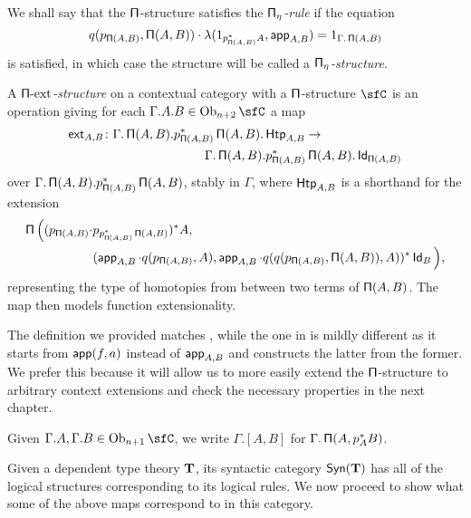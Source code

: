 \begin{defn}
  We shall say that the $\operatorname{\mathsf{\Pi}}$-structure satisfies the
  \emph{$\operatorname{\mathsf{\Pi}_\eta}$-rule} if the equation
  \[q(p_{\operatorname{\mathsf{\Pi}}(A,B)},\operatorname{\mathsf{\Pi}}(A,B))\cdot\lambda(1_{p^*_{\operatorname{\mathsf{\Pi}}(A,B)}A},\operatorname{\mathsf{app}}_{A,B})=1_{\Gamma.\operatorname{\mathsf{\Pi}}(A,B)}\]
  is satisfied, in which case the structure will be called a
  \emph{$\operatorname{\mathsf{\Pi}_\eta}$-structure}. 

  A \emph{$\operatorname{\mathsf{\Pi}-ext}$-structure} on a contextual category with a $\operatorname{\mathsf{\Pi}}$-structure
  $\sfC$ is an operation giving for each $\Gamma.A.B\in\Ob_{n+2}\sfC$ a map
  \begin{align*}
    \operatorname{\mathsf{ext}}_{A,B} &\colon
    \Gamma.\operatorname{\mathsf{\Pi}}(A,B).p^*_{\operatorname{\mathsf{\Pi}}(A,B)}\operatorname{\mathsf{\Pi}}(A,B).\operatorname{\mathsf{Htp}}_{A,B}\rightarrow \\
    &\quad\quad\quad\quad\quad\quad\quad\quad
    \Gamma.\operatorname{\mathsf{\Pi}}(A,B).p^*_{\operatorname{\mathsf{\Pi}}(A,B)}\operatorname{\mathsf{\Pi}}(A,B).\operatorname{\mathsf{Id}}_{\operatorname{\mathsf{\Pi}}(A,B)}
  \end{align*}
  over $\Gamma.\operatorname{\mathsf{\Pi}}(A,B).p^*_{\operatorname{\mathsf{\Pi}}(A,B)}\operatorname{\mathsf{\Pi}}(A,B)$, stably in $\Gamma$, where
  $\operatorname{\mathsf{Htp}}_{A,B}$ is a shorthand for the extension
  \begin{align*}
    \operatorname{\mathsf{\Pi}}\Big((p_{\operatorname{\mathsf{\Pi}}(A,B)}\cdot & p_{p^*_{\operatorname{\mathsf{\Pi}}(A,B)}\operatorname{\mathsf{\Pi}}(A,B)})^*A, \\
    &(\operatorname{\mathsf{app}}_{A,B}\cdot q(p_{\operatorname{\mathsf{\Pi}}(A,B)},A),
    \operatorname{\mathsf{app}}_{A,B}\cdot q(q(p_{\operatorname{\mathsf{\Pi}}(A,B)},\operatorname{\mathsf{\Pi}}(A,B)),A))^*\operatorname{\mathsf{Id}}_B\Big),
  \end{align*}
  representing the type of homotopies from between two terms of $\operatorname{\mathsf{\Pi}}(A,B)$. The
  map then models function extensionality.
\end{defn}

\begin{rmk}
  The definition we provided matches \cite[Def.~2.5]{KL18}, while the one in
  \cite[App.~B.1.1]{KL12} is mildly different as it starts from
  $\operatorname{\mathsf{app}}(f,a)$ instead of $\operatorname{\mathsf{app}}_{A,B}$ and constructs the latter from the
  former. We prefer this because it will allow us to more easily extend the
  $\operatorname{\mathsf{\Pi}}$-structure to arbitrary context extensions and check the necessary
  properties in the next chapter.
\end{rmk}

\begin{notation}
  Given $\Gamma.A,\Gamma.B\in\Ob_{n+1}\sfC$, we write $\Gamma.[A,B]$ for
  $\Gamma.\operatorname{\mathsf{\Pi}}(A,p^*_AB)$.
\end{notation}

\begin{exmp}
  Given a dependent type theory $\operatorname{\mathbf{T}}$, its syntactic category $\mathsf{Syn}(\mathbf{T})$ has all
  of the logical structures corresponding to its logical rules. We now proceed
  to show what some of the above maps correspond to in this category.
\end{exmp}

